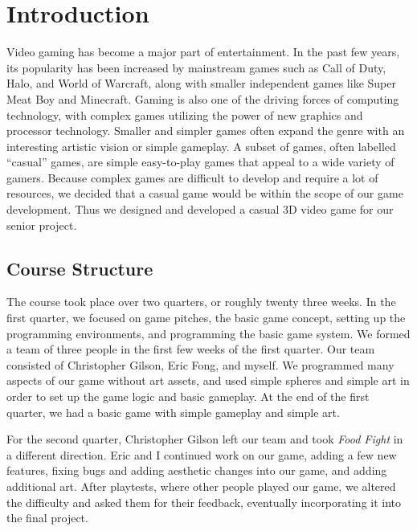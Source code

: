 \documentclass{article}
\begin{document}

\setcounter{tocdepth}{2}
\thispagestyle{empty}
\tableofcontents
\newpage
\thispagestyle{empty}
\listoffigures
\newpage
\setcounter{page}{1}


\section{Introduction}

Video gaming has become a major part of entertainment. In the past few years, its popularity has been increased by mainstream games such as Call of Duty, Halo, and World of Warcraft, along with smaller independent games like Super Meat Boy and Minecraft. Gaming is also one of the driving forces of computing technology, with complex games utilizing the power of new graphics and processor technology. Smaller and simpler games often expand the genre with an interesting artistic vision or simple gameplay. A subset of games, often labelled ``casual''
games, are simple easy-to-play games that appeal to a wide variety of gamers.
Because complex games are difficult to develop and require a lot of resources,
we decided that a casual game would be within the scope of our game development.
Thus we designed and developed a casual 3D video game for our senior project.

\subsection{Course Structure}

The course took place over two quarters, or roughly twenty three weeks. In the
first quarter, we focused on game pitches, the basic game concept, setting up
the programming environments, and programming the basic game system. We formed a
team of three people in the first few weeks of the first quarter. Our team
consisted of Christopher Gilson, Eric Fong, and myself. We programmed many aspects
of our game without art assets, and used simple spheres and simple art in order
to set up the game logic and basic gameplay. At the end of the first quarter, we
had a basic game with simple gameplay and simple art.

For the second quarter, Christopher Gilson left our team and took \textit{Food Fight} 
in a different direction. Eric and I continued work on our game, adding a
few new features, fixing bugs and adding aesthetic changes into our game, and
adding additional art. After playtests, where other people played our game, we
altered the difficulty and asked them for their feedback, eventually
incorporating it into the final project.
\end{document}
